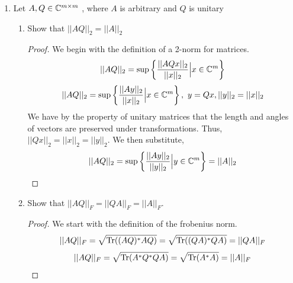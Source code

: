 \documentclass{article}
\begin{document}
\begin{enumerate}
\begin{enumerate}
        \item
        Prove or disprove $||A||_F = ||u||_F||v||_F$

        \begin{proof}
            We begin with the definition of the Frobenius Norm. 
            \[
                ||A||_F = \sqrt{\Tr{AA^*}} = \sqrt{\Tr{uv^*vu^*}}
            \]
            \[
                ||A||_F = \sqrt{\Tr{u||v||_2^2u^*}} = ||v||_2 \sqrt{\tr{uu^*}}
            \]
            \[
                ||A||_F = ||v||_2 \sqrt{||u||_2^2} = ||v||_2||u||_2 = ||v||_F||u||_F 
            \]
        \end{proof}
    \end{enumerate}%

    \item %
    Let $A, Q \in \mathbb{C}^{m\times m}$ , where $A$ is arbitrary and $Q$ is unitary
    \begin{enumerate}
        \item Show that $||AQ||_2 = ||A||_2$
        \begin{proof}
        We begin with the definition of a 2-norm for matrices. 
        \[
            ||AQ||_2 = \sup\left\{\frac{||AQx||_2}{||x||_2} \Big| x \in \mathbb{C}^m\right\}
        \]
        \[
            ||AQ||_2 = \sup\left\{\frac{||Ay||_2}{||x||_2} \Big| x \in \mathbb{C}^m\right\}, \text{ } y = Qx, ||y||_2 = ||x||_2
        \]
        We have by the property of unitary matrices that the length and angles of vectors are preserved under transformations. Thus, $||Qx||_2 = ||x||_2 = ||y||_2$. We then substitute, 
        \[
            ||AQ||_2 = \sup\left\{\frac{||Ay||_2}{||y||_2} \Big| y \in \mathbb{C}^m\right\} = ||A||_2
        \]
        \end{proof}

        \item  Show that $||AQ||_F = ||QA||_F = ||A||_F$.
        \begin{proof}
            We start with the definition of the frobenius norm. 
            \[
                ||AQ||_F = \sqrt{\text{Tr}((AQ)^*AQ)} = \sqrt{\text{Tr}((QA)^*QA)} = ||QA||_F
            \]
            \[
                ||AQ||_F = \sqrt{\text{Tr}(A^*Q^*QA)} = \sqrt{\text{Tr}(A^*A)} = ||A||_F
            \]
        \end{proof}
    \end{enumerate} %
    

\end{enumerate}
\end{document}
